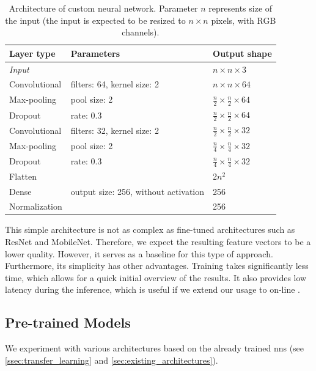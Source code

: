 \begin{table}
    \centering
    \begin{tabular}{l|l|l}
         Layer type & Parameters & Output shape \\ \hline
         \emph{Input} & & $n \times n \times 3$ \\
         Convolutional & filters: 64, kernel size: 2 & $n \times n \times 64$ \\
         Max-pooling & pool size: 2 & $\frac{n}{2} \times \frac{n}{2} \times 64$ \\
         Dropout & rate: 0.3 & $\frac{n}{2} \times \frac{n}{2} \times 64$ \\
         Convolutional & filters: 32, kernel size: 2 & $\frac{n}{2} \times \frac{n}{2} \times 32$ \\
         Max-pooling & pool size: 2 & $\frac{n}{4} \times \frac{n}{4} \times 32$ \\
         Dropout & rate: 0.3 & $\frac{n}{4} \times \frac{n}{4} \times 32$ \\
         Flatten & & 2$n^2$ \\
         Dense & output size: 256, without activation & 256 \\
         Normalization & & 256
    \end{tabular}
    \caption[Architecture of custom neural network]{Architecture of custom neural network. Parameter $n$ represents size of the input (the input is expected to be resized to $n\times n$ pixels, with RGB channels).}
    \label{tab:custom_architecture}
\end{table}

This simple architecture is not as complex as fine-tuned architectures such as ResNet and MobileNet. Therefore, we expect the resulting feature vectors to be a lower quality. However, it serves as a baseline for this type of approach. Furthermore, its simplicity has other advantages. Training takes significantly less time, which allows for a quick initial overview of the results. It also provides low latency during the inference, which is useful if we extend our usage to on-line \reid{}.

\subsection{Pre-trained Models}

\label{ssec:pretrained_models}

We experiment with various architectures based on the already trained \glspl{nn} (see \autoref{ssec:transfer_learning} and \autoref{sec:existing_architectures}).

